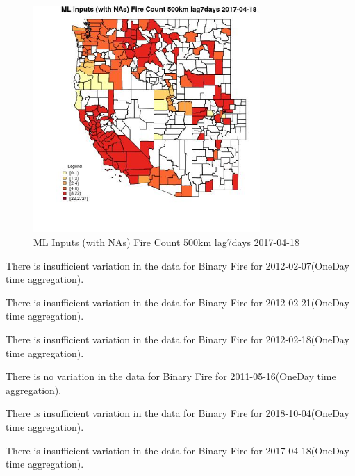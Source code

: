 \begin{figure} 
\centering  
\includegraphics[width=0.77\textwidth]{Code_Outputs/Report_ML_input_PM25_Step4_part_f_de_duplicated_aveswNAs_CountyFire_Count_500km_lag7daysMean2017-04-18.jpg} 
\caption{\label{fig:Report_ML_input_PM25_Step4_part_f_de_duplicated_aveswNAsCountyFire_Count_500km_lag7daysMean2017-04-18}ML Inputs (with NAs) Fire Count 500km lag7days 2017-04-18} 
\end{figure} 
 

There is insufficient variation in the data for Binary Fire for 2012-02-07(OneDay time aggregation). 
 

There is insufficient variation in the data for Binary Fire for 2012-02-21(OneDay time aggregation). 
 

There is insufficient variation in the data for Binary Fire for 2012-02-18(OneDay time aggregation). 
 

There is no variation in the data for Binary Fire for 2011-05-16(OneDay time aggregation). 
 

There is insufficient variation in the data for Binary Fire for 2018-10-04(OneDay time aggregation). 
 

There is insufficient variation in the data for Binary Fire for 2017-04-18(OneDay time aggregation). 
 

